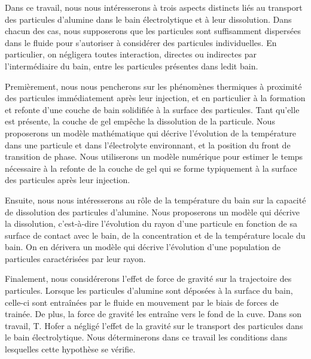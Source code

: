 Dans ce travail, nous nous intéresserons à trois aspects distincts
liés au transport des particules d'alumine dans le bain électrolytique
et à leur dissolution. Dans chacun des cas, nous supposerons que les
particules sont suffisamment dispersées dans le fluide pour
s'autoriser à considérer des particules individuelles. En particulier,
on négligera toutes interaction, directes ou indirectes par
l'intermédiaire du bain, entre les particules présentes dans ledit bain.

Premièrement, nous nous pencherons sur les phénomènes thermiques à
proximité des particules immédiatement après leur injection, et en
particulier à la formation et refonte d'une couche de bain solidifiée
à la surface des particules. Tant qu'elle est présente, la couche de
gel empêche la dissolution de la particule. Nous proposerons un modèle
mathématique qui décrive l'évolution de la température dans une
particule et dans l'électrolyte environnant, et la position du front
de transition de phase. Nous utiliserons un modèle numérique pour
estimer le temps nécessaire à la refonte de la couche de gel qui se
forme typiquement à la surface des particules après leur injection.

Ensuite, nous nous intéresserons au rôle de la température du bain sur
la capacité de dissolution des particules d'alumine. Nous proposerons
un modèle qui décrive la dissolution, c'est-à-dire l'évolution du
rayon d'une particule en fonction de sa surface de contact avec le
bain, de la concentration et de la température locale du bain. On en
dérivera un modèle qui décrive l'évolution d'une population de
particules caractérisées par leur rayon.

Finalement, nous considérerons l'effet de force de gravité sur la
trajectoire des particules. Lorsque les particules d'alumine sont
déposées à la surface du bain, celle-ci sont entraînées par le fluide
en mouvement par le biais de forces de trainée. De plus, la force de
gravité les entraîne vers le fond de la cuve. Dans son travail,
T. Hofer \cite{Hofer2011} a négligé l'effet de la gravité sur le
transport des particules dans le bain électrolytique. Nous
déterminerons dans ce travail les conditions dans lesquelles cette
hypothèse se vérifie.
